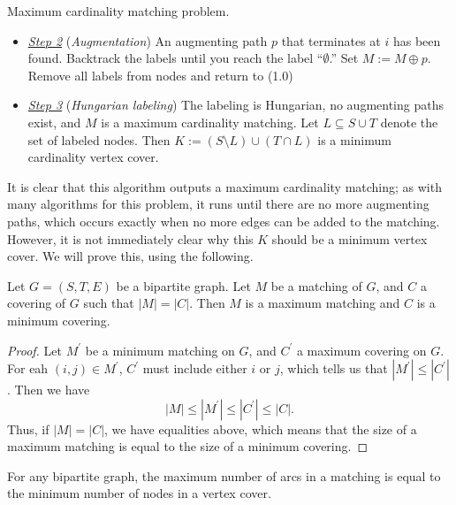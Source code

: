 \documentclass[11pt]{article}
\renewcommand{\'}{^{'}}
\newenvironment{theorem}[2][Theorem]{\begin{trivlist}
\item[\hskip \labelsep {\bfseries #1}\hskip \labelsep {\bfseries #2.}]}{\end{trivlist}}
\newenvironment{lemma}[2][Lemma]{\begin{trivlist}
\item[\hskip \labelsep {\bfseries #1}\hskip \labelsep {\bfseries #2.}]}{\end{trivlist}}
\begin{document}
\begin{section}{Maximum cardinality matching problem.}
\begin{itemize}
	\item \underline{\emph{Step 2}} (\emph{Augmentation})
		  An augmenting path $p$ that terminates at $i$ has been found. Backtrack the 
		  labels until you reach the label ``$\emptyset$.'' Set 
		  $M := M\oplus p$. Remove all labels from nodes and return to (1.0)
	  \item \underline{\emph{Step 3}} (\emph{Hungarian labeling})
		  The labeling is Hungarian, no augmenting paths exist, and $M$ is a 
		  maximum cardinality matching. Let $L\subseteq S\cup T$ denote the set 
		  of labeled nodes. Then $K := (S\setminus L) \cup (T\cap L)$ is a minimum 
		  cardinality vertex cover. 
\end{itemize}

It is clear that this algorithm outputs a maximum cardinality matching; as with many 
algorithms for this problem, it runs until there are no more augmenting paths, which 
occurs exactly when no more edges can be added to the matching. However, it is not 
immediately clear why this $K$ should be a minimum vertex cover. We will prove this, 
using the following.

\begin{lemma}{}
	Let $G = (S, T, E)$ be a bipartite graph. Let $M$ be a matching of $G$, and $C$ a 
	covering of $G$ such that $|M| = |C|$. Then $M$ is a maximum matching and $C$ is a 
	minimum covering.
\end{lemma}

\begin{proof}
	Let $M^{'}$ be a minimum matching on $G$, and $C^{'}$ a maximum covering on $G$. 
	For eah $(i,j)\in M^{'}$, $C^{'}$ must include either $i$ or $j$, which tells 
	us that $|M^{'}| \leq |C^{'}|$. Then we have 
	\[
		|M|\leq |M^{'}| \leq |C^{'}|\leq |C|.
	\]
	Thus, if $|M| = |C|$, we have equalities above, which means that the size of 
	a maximum matching is equal to the size of a minimum covering.
\end{proof}

\begin{theorem}{(K\H{o}nig-Egervary)}
	For any bipartite graph, the maximum number of arcs in a matching is equal to 
	the minimum number of nodes in a vertex cover.
\end{theorem}


\end{section}
\end{document}
